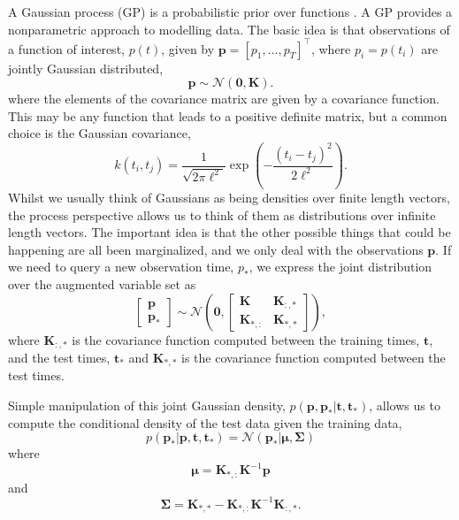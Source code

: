 \documentclass{article}
\begin{document}
A  Gaussian  process (GP)  is  a  probabilistic  prior over  functions
\cite{Rasmussen:book06}.  A GP  provides a  nonparametric  approach to
modelling data. The  basic idea is that observations  of a function of
interest,   $p(t)$,   given  by   $\mathbf{p}   =  \left[p_1,   \dots,
  p_T\right]^\top$,   where    $p_i=p(t_i)$   are   jointly   Gaussian
distributed,
\begin{equation}
  \mathbf{p} \sim \mathcal{N}(\mathbf{0}, \mathbf{K}).
\end{equation}
where the elements of the  covariance matrix are given by a covariance
function. This may  be any function that leads  to a positive definite
matrix, but a common choice is the Gaussian covariance,
\begin{equation}
  k(t_i,   t_j)   =  \frac{1}{\sqrt{2\pi   \ell^2}}\exp\left(-\frac{(t_i
      -t_j)^2}{2\ell^2}\right).
\end{equation}
Whilst we usually  think of Gaussians as being  densities over finite
length vectors, the process perspective  allows us to think of them as
distributions over infinite length vectors. The important idea is that
the  other  possible things  that  could  be  happening are  all  been
marginalized, and we only  deal with the observations $\mathbf{p}$. If
we need to  query a new observation time, $p_*$,  we express the joint
distribution over the augmented variable set as
\begin{equation}
  \left[\begin{matrix}
      \mathbf{p}\\
      \mathbf{p}_*
    \end{matrix}\right]
  \sim \mathcal{N}\left(\mathbf{0}, \left[\begin{matrix}
        \mathbf{K} & \mathbf{K}_{:,*}\\
        \mathbf{K}_{*,:} & \mathbf{K}_{*,*}
      \end{matrix}
    \right]\right),
\end{equation}
where $\mathbf{K}_{:,*}$  is the covariance  function computed between
the training  times, $\mathbf{t}$, and the  test times, $\mathbf{t}_*$
and $\mathbf{K}_{*,*}$ is the covariance function computed between the
test times.

Simple  manipulation of  this joint  Gaussian  density, $p(\mathbf{p},
\mathbf{p_*}|\mathbf{t},  \mathbf{t}_*)$,  allows  us to  compute  the
conditional density of the test data given the training data,
\begin{equation}
  p(\mathbf{p}_* | \mathbf{p}, \mathbf{t}, \mathbf{t}_*) = \mathcal{N}\left(\mathbf{p}_*|\boldsymbol{\mu}, \boldsymbol{\Sigma}\right)
\end{equation}
where
\begin{equation}
  \boldsymbol{\mu} = \mathbf{K}_{*,:}\mathbf{K}^{-1}\mathbf{p}
\end{equation}
and 
\begin{equation}
  \boldsymbol{\Sigma} = \mathbf{K}_{*,*} - \mathbf{K}_{*,:}\mathbf{K}^{-1}\mathbf{K}_{:,*}.
\end{equation}
\end{document}
